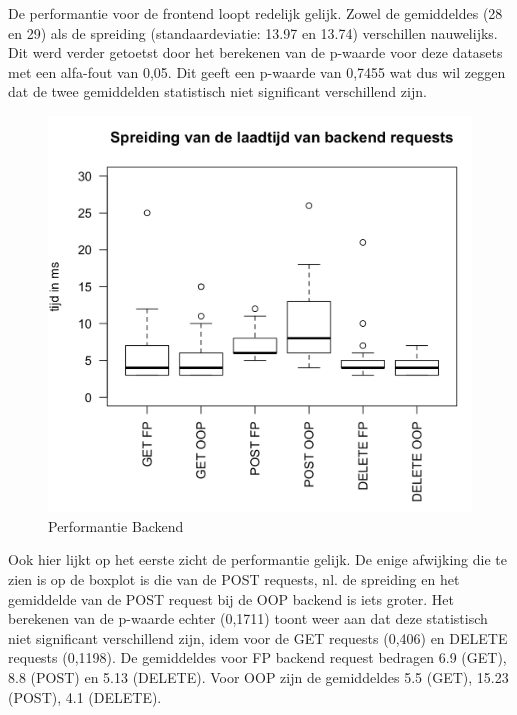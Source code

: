  De performantie voor de frontend loopt redelijk gelijk. Zowel de gemiddeldes (28 en 29) als de spreiding (standaardeviatie: 13.97 en 13.74) verschillen nauwelijks. Dit werd verder getoetst door het berekenen van de p-waarde voor deze datasets met een alfa-fout van 0,05. Dit geeft een p-waarde van 0,7455 wat dus wil zeggen dat de twee gemiddelden statistisch niet significant verschillend zijn.  


\begin{figure}
    \includegraphics[width=\linewidth]{img/performantie-backend.png}
    \caption{Performantie Backend}
    \label{fig:performantiebackend}
  \end{figure}

  Ook hier lijkt op het eerste zicht de performantie gelijk. De enige afwijking die te zien is op de boxplot is die van de POST requests, nl. de spreiding en het gemiddelde van de POST request bij de OOP backend is iets groter. Het berekenen van de p-waarde echter (0,1711) toont weer aan dat deze statistisch niet significant verschillend zijn, idem voor de GET requests (0,406) en DELETE requests (0,1198). De gemiddeldes voor FP backend request bedragen 6.9 (GET), 8.8 (POST) en 5.13 (DELETE). Voor OOP zijn de gemiddeldes 5.5 (GET), 15.23 (POST), 4.1 (DELETE).

